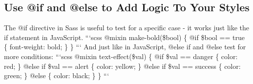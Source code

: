 \documentclass{article}%
\begin{document}
%
\subsection{Use @if and @else to Add Logic To Your Styles}%
\label{subsec:Use@ifand@elsetoAddLogicToYourStyles}%
The @if directive in Sass is useful to test for a specific case {-} it works just like the if statement in JavaScript.\newline%
```scss\newline%
@mixin make{-}bold(\$bool) \{\newline%
  @if \$bool == true \{\newline%
    font{-}weight: bold;\newline%
  \}\newline%
\}\newline%
```\newline%
And just like in JavaScript, @else if and @else test for more conditions:\newline%
```scss\newline%
@mixin text{-}effect(\$val) \{\newline%
  @if \$val == danger \{\newline%
    color: red;\newline%
  \}\newline%
  @else if \$val == alert \{\newline%
    color: yellow;\newline%
  \}\newline%
  @else if \$val == success \{\newline%
    color: green;\newline%
  \}\newline%
  @else \{\newline%
    color: black;\newline%
  \}\newline%
\}\newline%
```\newline%

%
\end{document}
